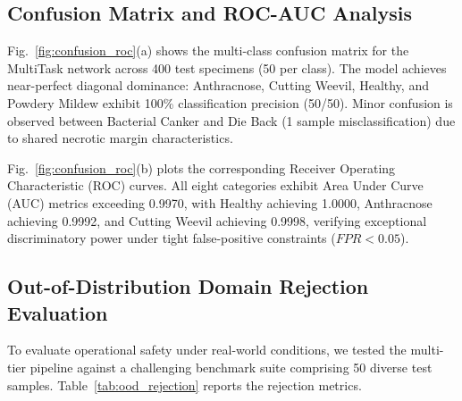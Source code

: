 \documentclass[conference]{IEEEtran}
\begin{document}
\subsection{Confusion Matrix and ROC-AUC Analysis}
Fig.~\ref{fig:confusion_roc}(a) shows the multi-class confusion matrix for the MultiTask network across 400 test specimens (50 per class). The model achieves near-perfect diagonal dominance: Anthracnose, Cutting Weevil, Healthy, and Powdery Mildew exhibit 100\% classification precision (50/50). Minor confusion is observed between Bacterial Canker and Die Back (1 sample misclassification) due to shared necrotic margin characteristics.

Fig.~\ref{fig:confusion_roc}(b) plots the corresponding Receiver Operating Characteristic (ROC) curves. All eight categories exhibit Area Under Curve (AUC) metrics exceeding 0.9970, with Healthy achieving 1.0000, Anthracnose achieving 0.9992, and Cutting Weevil achieving 0.9998, verifying exceptional discriminatory power under tight false-positive constraints ($FPR < 0.05$).

\subsection{Out-of-Distribution Domain Rejection Evaluation}
To evaluate operational safety under real-world conditions, we tested the multi-tier pipeline against a challenging benchmark suite comprising 50 diverse test samples. Table~\ref{tab:ood_rejection} reports the rejection metrics. 

\begin{table}[!htbp]
\caption{Out-of-Distribution (OOD) Domain Rejection Evaluation}
\label{tab:ood_rejection}
\centering
{}
\end{table}
\end{document}
